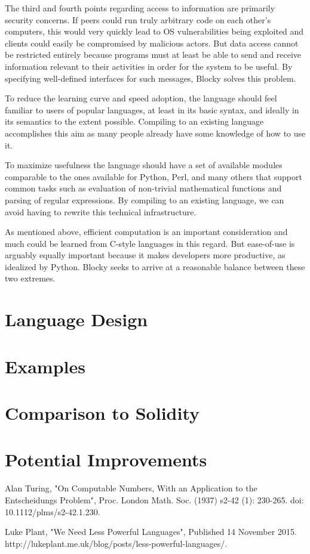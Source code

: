 \documentclass[letterpaper]{article}
\begin{document}
The third and fourth points regarding access to information are primarily security concerns. If peers could run truly arbitrary code on each other's computers, this would very quickly lead to OS vulnerabilities being exploited and clients could easily be compromised by malicious actors. But data access cannot be restricted entirely because programs must at least be able to send and receive information relevant to their activities in order for the system to be useful. By specifying well-defined interfaces for such messages, Blocky solves this problem.

To reduce the learning curve and speed adoption, the language should feel familiar to users of popular languages, at least in its basic syntax, and ideally in its semantics to the extent possible. Compiling to an existing language accomplishes this aim as many people already have some knowledge of how to use it.

To maximize usefulness the language should have a set of available modules comparable to the ones available for Python, Perl, and many others that support common tasks such as evaluation of non-trivial mathematical functions and parsing of regular expressions. By compiling to an existing language, we can avoid having to rewrite this technical infrastructure.

As mentioned above, efficient computation is an important consideration and much could be learned from C-style languages in this regard. But ease-of-use is arguably equally important because it makes developers more productive, as idealized by Python. Blocky seeks to arrive at a reasonable balance between these two extremes.

\section{Language Design}

\section{Examples}

\section{Comparison to Solidity}

\section{Potential Improvements}

\begin{thebibliography}{9}

  Alan Turing,
  "On Computable Numbers, With an Application to the Entscheidungs Problem",
  Proc. London Math. Soc. (1937) s2-42 (1): 230-265.
  doi: 10.1112/plms/s2-42.1.230.
  
  Luke Plant,
  "We Need Less Powerful Languages",
  Published 14 November 2015.
  http://lukeplant.me.uk/blog/posts/less-powerful-languages/.
  
\end{thebibliography}
  
\end{document}
